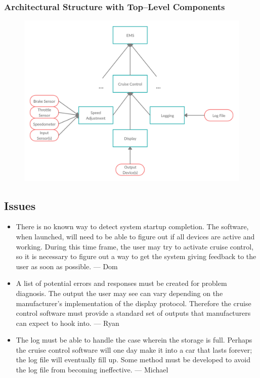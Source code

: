 \documentclass{article}
\begin{document}
	\newpage
	\subsubsection{Architectural Structure with Top--Level Components}
	\begin{figure}[!htb]
		\centering
		\includegraphics[scale=.28]{cs347_5b}
	\end{figure}
	
	\subsection{Issues}
	\begin{itemize}
		\item There is no known way to detect system startup completion. The software, when launched, will need to be able to figure out if all devices are active and working. During this time frame, the user may try to activate cruise control, so it is necessary to figure out a way to get the system giving feedback to the user as soon as possible. --- Dom
		\item A list of potential errors and responses must be created for problem diagnosis. The output the user may see can vary depending on the manufacturer's implementation of the display protocol. Therefore the cruise control software must provide a standard set of outputs that manufacturers can expect to hook into. --- Ryan
		\item The log must be able to handle the case wherein the storage is full. Perhaps the cruise control software will one day make it into a car that lasts forever; the log file will eventually fill up. Some method must be developed to avoid the log file from becoming ineffective. --- Michael
	\end{itemize}
	
\end{document}
